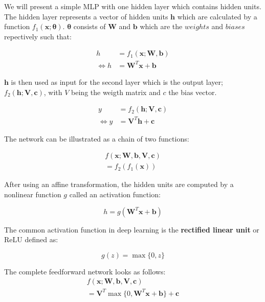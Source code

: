 We will present a simple MLP with one hidden layer which contains hidden units.
The hidden layer represents a vector of hidden units $\bm{h}$ which are
calculated by a function $f_{1}(\bm{x;\theta})$. $\bm{\theta}$ consists of
$\bm{W}$ and $\bm{b}$ which are the $weights$ and $biases$
repectively such that:

\begin{equation}
  \begin{split}
    h & = f_{1}(\bm{x;W,b}) \\
    \Leftrightarrow h & = \bm{W}^{T}\bm{x}+\bm{b}
  \end{split}
\end{equation}

$\bm{h}$ is then used as input for the second layer which is the output layer;
$f_{2}(\bm{h;V,c})$, with $V$ being the weigth matrix and $c$ the bias vector. 

\begin{equation}
  \begin{split}
    y & = f_{2}(\bm{h;V,c}) \\
    \Leftrightarrow y & = \bm{V}^{T}\bm{h}+\bm{c}
  \end{split}
\end{equation}

The network can be illustrated as a chain of two functions:

\begin{equation} 
  \begin{split}
  f(\bm{x;W,b,V,c}) \\
  = f_{2}(f_{1}(\bm{x}))
  \end{split}
\end{equation}

After using an affine transformation, the hidden units are computed by a
nonlinear function $g$ called an activation function:

\begin{equation} 
  h = g(\bm{W}^{T}\bm{x+b})
\end{equation}

The common activation function in deep learning is the \textbf{rectified linear
unit} or ReLU defined as:

\begin{equation} 
  g(z) = \max\{0,z\}
\end{equation}



The complete feedforward network looks as follows:
\begin{equation} 
  \begin{split}
  f(\bm{x;W,b,V,c}) \\
  = \bm{V}^{T}\max\{0,\bm{W}^{T}\bm{x+b}\}+\bm{c}
\end{split}
\end{equation}

